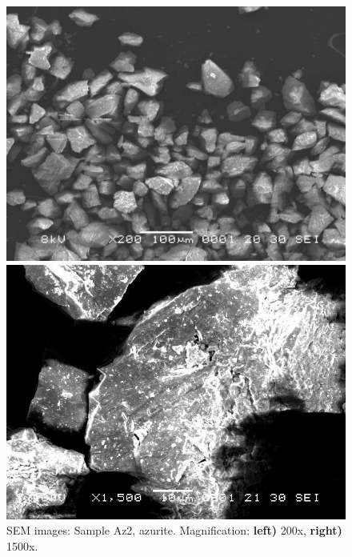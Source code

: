 \begin{figure}[H]
\centering
\begin{minipage}{.45\textwidth}
  \centering
  \includegraphics[width=\linewidth]{Az2_x200_1_240221}
\end{minipage}
\begin{minipage}{.45\textwidth}
  \centering
  \includegraphics[width=\linewidth]{Az2_x1500_1_150321}
\end{minipage}
\caption[SEM images: Sample Az2, azurite]{SEM images: Sample Az2, azurite. Magnification: \textbf{left)} 200x, \textbf{right)} 1500x.}
\label{fig:az2_sem_1}
\end{figure}



